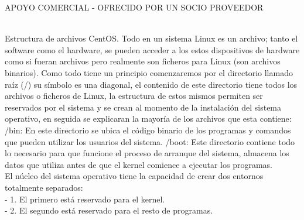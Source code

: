 \begin{itemize}
\begin{center}
\item APOYO COMERCIAL - OFRECIDO POR UN SOCIO PROVEEDOR
\end{center}
\\ Estructura de archivos CentOS. Todo en un sistema Linux es un archivo; tanto el software como el hardware, se pueden acceder a los estos dispositivos de hardware como si fueran archivos pero realmente son ficheros para Linux (son archivos binarios). Como todo tiene un principio comenzaremos por el directorio llamado raíz (/) su símbolo es una diagonal, el contenido de este directorio tiene todos los archivos o ficheros de Linux, la estructura de estos mismos permiten ser reservados por el sistema y se crean al momento de la instalación del sistema operativo, en seguida se explicaran la mayoría de los archivos que esta contiene: /bin: En este directorio se ubica el código binario de los programas y comandos que pueden utilizar los usuarios del sistema. /boot: Este directorio contiene todo lo necesario para que funcione el proceso de arranque del sistema, almacena los datos que utiliza antes de que el kernel comience a ejecutar los programas.
\\El núcleo del sistema operativo tiene la capacidad de crear dos entornos totalmente separados:
\\- 	1. El primero está reservado para el kernel.
\\-	2. El segundo está reservado para el resto de programas.

\end{itemize}
